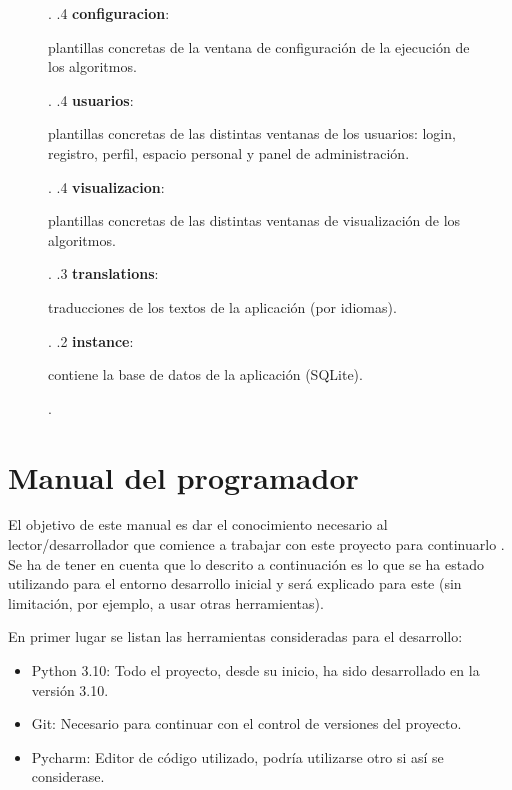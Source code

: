 \begin{figure}[H]
{\begin{minipage}[t]{10cm}
        \end{minipage}.
        .4 \textbf{configuracion}: \begin{minipage}[t]{10cm}
            plantillas concretas de la ventana de configuración de la ejecución de los algoritmos{.}\\
        \end{minipage}.
        .4 \textbf{usuarios}: \begin{minipage}[t]{10cm}
            plantillas concretas de las distintas ventanas de los usuarios: login, registro, perfil, espacio personal y panel de administración{.}\\
        \end{minipage}.
        .4 \textbf{visualizacion}: \begin{minipage}[t]{10cm}
            plantillas concretas de las distintas ventanas de visualización de los algoritmos{.}\\
        \end{minipage}.
        .3 \textbf{translations}: \begin{minipage}[t]{10cm}
            traducciones de los textos de la aplicación (por idiomas){.}\\
        \end{minipage}. 
        .2 \textbf{instance}: \begin{minipage}[t]{10cm} contiene
        la base de datos de la aplicación (SQLite){.}\\
            \end{minipage}.
    }
\end{figure}

\section{Manual del programador}
El objetivo de este manual es dar el conocimiento necesario al 
lector/desarrollador que comience a trabajar con este proyecto para continuarlo . Se ha de
tener en cuenta que lo descrito a continuación es lo que se ha estado utilizando 
para el entorno desarrollo inicial y será explicado para este (sin limitación, por ejemplo,
a usar otras herramientas).

En primer lugar se listan las herramientas consideradas para el desarrollo:
\begin{itemize}
    \item Python 3.10: Todo el proyecto, desde su inicio, ha sido desarrollado en la versión 3.10.
    \item Git: Necesario para continuar con el control de versiones del proyecto.
    \item Pycharm: Editor de código utilizado, podría utilizarse otro si así se considerase.
\end{itemize}

